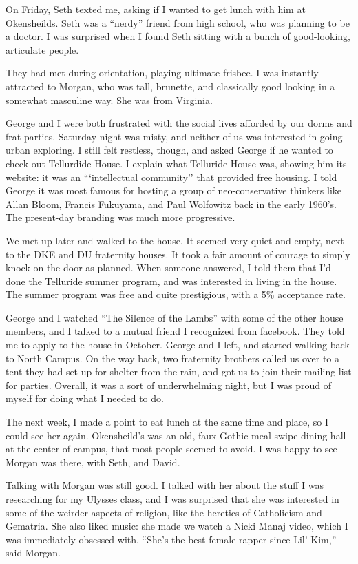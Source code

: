 On Friday, Seth texted me, asking if I wanted to get lunch with him at
Okensheilds.  Seth was a ``nerdy'' friend from high school, who was planning to
be a doctor.  I was surprised when I found Seth sitting with a bunch of
good-looking, articulate people.

They had met during orientation, playing ultimate frisbee.  I was instantly
attracted to Morgan, who was tall, brunette, and classically good looking in a
somewhat masculine way.  She was from Virginia. 

George and I were both frustrated with the social lives afforded by our dorms
and frat parties.  Saturday night was misty, and neither of us was interested in
going urban exploring.  I still felt restless, though, and asked George if he
wanted to check out Tellurdide House.  I explain what Telluride House was,
showing him its website: it was an ```intellectual community'' that provided
free housing.  I told George it was most famous for hosting a group of
neo-conservative thinkers like Allan Bloom, Francis Fukuyama, and Paul Wolfowitz
back in the early 1960's.  The present-day branding was much more progressive.

We met up later and walked to the house.  It seemed very quiet and empty, next
to the DKE and DU fraternity houses.  It took a fair amount of courage to simply
knock on the door as planned.  When someone answered, I told them that I'd done
the Telluride summer program, and was interested in living in the house.  The
summer program was free and quite prestigious, with a 5\% acceptance rate.

George and I watched ``The Silence of the Lambs'' with some of the other house
members, and I talked to a mutual friend I recognized from facebook.  They told
me to apply to the house in October.  George and I left, and started walking
back to North Campus.  On the way back, two fraternity brothers called us over
to a tent they had set up for shelter from the rain, and got us to join their
mailing list for parties.  Overall, it was a sort of underwhelming night, but I
was proud of myself for doing what I needed to do.


The next week, I made a point to eat lunch at the same time and place, so I
could see her again.  Okensheild's was an old, faux-Gothic meal swipe dining
hall at the center of campus, that most people seemed to avoid.   I was happy to
see Morgan was there, with Seth, and David.

Talking with Morgan was still good.  I talked with her about the stuff I was
researching for my Ulysses class, and I was surprised that she was interested in
some of the weirder aspects of religion, like the heretics of Catholicism and
Gematria.  She also liked music: she made we watch a Nicki Manaj video, which I
was immediately obsessed with.  ``She's the best female rapper since Lil' Kim,''
said Morgan.

